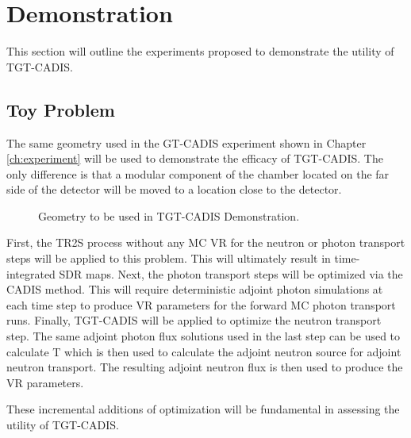 \section{Demonstration} \label{sec:demo}
This section will outline the experiments proposed to demonstrate the utility
of TGT-CADIS.  

\subsection{Toy Problem}
The same geometry used in the GT-CADIS experiment shown in Chapter \ref{ch:experiment}
will be used to demonstrate the efficacy of TGT-CADIS.  The only difference
is that a modular component of the chamber located on the far side of the
detector will be moved to a location close to the detector.  

\begin{figure} \label{fig:mov_geom}
    \caption [Geometry for TGT-CADIS Demonstration]
	{Geometry to be used in TGT-CADIS Demonstration.}
\end{figure}
{}

First, the TR2S process without any MC VR for the neutron or photon transport
steps will be applied to this problem.  This will ultimately result in
time-integrated SDR maps.
Next, the photon transport steps will be optimized via the CADIS method.  This
will require deterministic adjoint photon simulations at each time step to
produce VR parameters for the forward MC photon transport runs.
Finally, TGT-CADIS will be applied to optimize the neutron transport step.  The
same adjoint photon flux solutions used in the last step can be used to
calculate T which is then used to calculate the adjoint neutron source for
adjoint neutron transport. The resulting adjoint neutron flux is then used to
produce the VR parameters.

These incremental additions of optimization will be fundamental in assessing the
utility of TGT-CADIS. 



